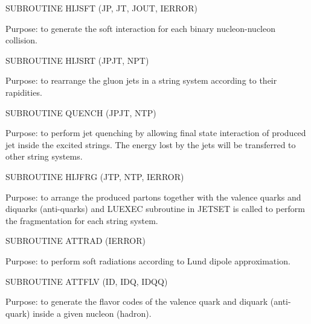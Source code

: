 \begin{description}
\itemsep=-4.0pt
\item{}SUBROUTINE HIJSFT (JP, JT, JOUT, IERROR)
\item{}Purpose: to generate the soft interaction for each binary
        nucleon-nucleon collision.
\end{description}

\begin{description}
\itemsep=-4.0pt
\item{}SUBROUTINE HIJSRT (JPJT, NPT)
\item{}Purpose: to rearrange the gluon jets in a string system according
        to their rapidities.
\end{description}

\begin{description}
\itemsep=-4.0pt
\item{}SUBROUTINE QUENCH (JPJT, NTP)
\item{}Purpose: to perform jet quenching by allowing final state 
        interaction of produced jet inside the excited strings. 
        The energy lost by the jets will be transferred to other
        string systems. 
\end{description}

\begin{description}
\itemsep=-4.0pt
\item{}SUBROUTINE HIJFRG (JTP, NTP, IERROR)
\item{}Purpose: to arrange the produced partons together with the
        valence quarks and diquarks (anti-quarks) and LUEXEC subroutine in
        JETSET is called to perform the fragmentation for each string
        system.
\end{description}

\begin{description}
\itemsep=-4.0pt
\item{}SUBROUTINE ATTRAD (IERROR)
\item{}Purpose: to perform soft radiations according to Lund dipole
        approximation.
\end{description}

\begin{description}
\itemsep=-4.0pt
\item{}SUBROUTINE ATTFLV (ID, IDQ, IDQQ)
\item{}Purpose: to generate the flavor codes of the valence quark and
        diquark (anti-quark) inside a given nucleon (hadron).
\end{description}

